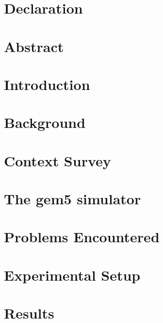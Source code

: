 \documentclass[12pt]{report}
\begin{document}
    
    
    
    \chapter*{Declaration}
    
    
    \chapter*{Abstract}
    
    
    \tableofcontents
    
    \chapter{Introduction}
    
    
    \chapter{Background}
    
    
    \chapter{Context Survey}
    
    
    \chapter{The gem5 simulator}
    
    
    \chapter{Problems Encountered}
    
    
    \chapter{Experimental Setup}\label{ch:experimental-setup}
    
    
    \chapter{Results}
    
    
\end{document}
